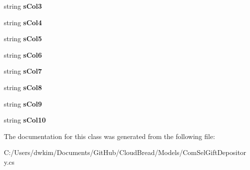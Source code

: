 \begin{DoxyCompactItemize}
\item 
string {\bfseries s\+Col3}\hypertarget{a00055_a15cfb034f3c005f576dcc091ecd32006}{}\label{a00055_a15cfb034f3c005f576dcc091ecd32006}

\item 
string {\bfseries s\+Col4}\hypertarget{a00055_aed5d2c3abca92336ee8addbc249d7b4e}{}\label{a00055_aed5d2c3abca92336ee8addbc249d7b4e}

\item 
string {\bfseries s\+Col5}\hypertarget{a00055_aba7aef32a3ef26418f7b5c87ea7a931b}{}\label{a00055_aba7aef32a3ef26418f7b5c87ea7a931b}

\item 
string {\bfseries s\+Col6}\hypertarget{a00055_af22a17be834c402d05d22ad9b427833b}{}\label{a00055_af22a17be834c402d05d22ad9b427833b}

\item 
string {\bfseries s\+Col7}\hypertarget{a00055_a78f398140ea16a150b48869cee7b6406}{}\label{a00055_a78f398140ea16a150b48869cee7b6406}

\item 
string {\bfseries s\+Col8}\hypertarget{a00055_a1d7ed92146fb652c40695561d5b2058c}{}\label{a00055_a1d7ed92146fb652c40695561d5b2058c}

\item 
string {\bfseries s\+Col9}\hypertarget{a00055_ac97b6665d775ade5b32a21c1fbafd7d8}{}\label{a00055_ac97b6665d775ade5b32a21c1fbafd7d8}

\item 
string {\bfseries s\+Col10}\hypertarget{a00055_a4a1088d101d7568cf9a2ea44669c58df}{}\label{a00055_a4a1088d101d7568cf9a2ea44669c58df}

\end{DoxyCompactItemize}


The documentation for this class was generated from the following file\+:\begin{DoxyCompactItemize}
\item 
C\+:/\+Users/dwkim/\+Documents/\+Git\+Hub/\+Cloud\+Bread/\+Models/Com\+Sel\+Gift\+Depository.\+cs\end{DoxyCompactItemize}
